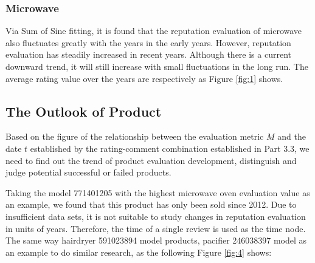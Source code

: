 \documentclass{mcmthesis}
\begin{document}
\subsubsection{Microwave}
Via Sum of Sine fitting, it is found that the reputation evaluation of microwave also fluctuates greatly with the years in the early years. However, reputation evaluation has steadily increased in recent years. Although there is a current downward trend, it will still increase with small fluctuations in the long run. The average rating value over the years are respectively as Figure \ref{fig:1} shows.

\subsection{The Outlook of Product}
Based on the figure of the relationship between the evaluation metric $ M $ and the date $ t $ established by the rating-comment combination established in Part 3.3, we need to find out the trend of product evaluation development, distinguish and judge potential successful or failed products.

Taking the model 771401205 with the highest microwave oven evaluation value as an example, we found that this product has only been sold since 2012. Due to insufficient data sets, it is not suitable to study changes in reputation evaluation in units of years. Therefore, the time of a single review is used as the time node. The same way hairdryer 591023894 model products, pacifier 246038397  model as an example to do similar research, as the following Figure \ref{fig:4} shows:

\end{document}

